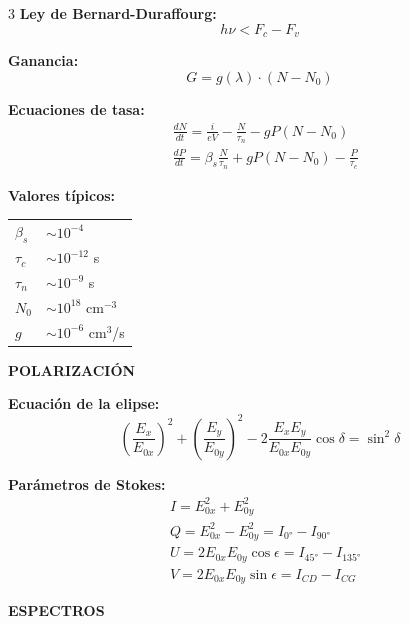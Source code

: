 \documentclass[10pt,a4paper,landscape]{article}
\newcommand{\secbox}[1]{\colorbox{blue!20}{\textbf{#1}}}
\begin{document}
\begin{multicols}{3}
\textbf{Ley de Bernard-Duraffourg:}
\begin{equation*}
\boxed{h\nu < F_c - F_v}
\end{equation*}

\textbf{Ganancia:}
\begin{equation*}
\boxed{G = g(\lambda) \cdot (N - N_0)}
\end{equation*}

\textbf{Ecuaciones de tasa:}
\begin{align*}
&\boxed{\frac{dN}{dt} = \frac{i}{eV} - \frac{N}{\tau_n} - gP(N - N_0)}\\
&\boxed{\frac{dP}{dt} = \beta_s \frac{N}{\tau_n} + gP(N - N_0) - \frac{P}{\tau_c}}
\end{align*}

\textbf{Valores típicos:}
\begin{tabular}{ll}
$\beta_s$ & $\sim 10^{-4}$ \\
$\tau_c$ & $\sim 10^{-12}$ s \\
$\tau_n$ & $\sim 10^{-9}$ s \\
$N_0$ & $\sim 10^{18}$ cm$^{-3}$ \\
$g$ & $\sim 10^{-6}$ cm$^3$/s \\
\end{tabular}

\secbox{POLARIZACIÓN}

\textbf{Ecuación de la elipse:}
\begin{equation*}
\boxed{\left(\frac{E_x}{E_{0x}}\right)^2 + \left(\frac{E_y}{E_{0y}}\right)^2 - 2\frac{E_x E_y}{E_{0x}E_{0y}}\cos\delta = \sin^2\delta}
\end{equation*}

\textbf{Parámetros de Stokes:}
\begin{align*}
&\boxed{I = E_{0x}^2 + E_{0y}^2}\\
&\boxed{Q = E_{0x}^2 - E_{0y}^2 = I_{0°} - I_{90°}}\\
&\boxed{U = 2E_{0x}E_{0y}\cos\epsilon = I_{45°} - I_{135°}}\\
&\boxed{V = 2E_{0x}E_{0y}\sin\epsilon = I_{CD} - I_{CG}}
\end{align*}

\secbox{ESPECTROS}


\end{multicols}
\end{document}
